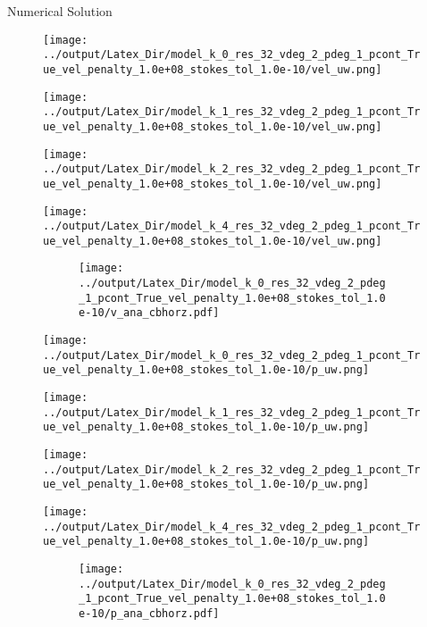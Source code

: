 \documentclass[10pt,aspectratio=169]{beamer}
\begin{document}
\begin{frame}{Numerical Solution}
	\vspace{-0.32in}
	\begin{figure}[!htb]
		\begin{multicols}{4}
			\texttt{[image: ../output/Latex\_Dir/model\_k\_0\_res\_32\_vdeg\_2\_pdeg\_1\_pcont\_True\_vel\_penalty\_1.0e+08\_stokes\_tol\_1.0e-10/vel\_uw.png]}\par
			\hspace{0.75in}
			\texttt{[image: ../output/Latex\_Dir/model\_k\_1\_res\_32\_vdeg\_2\_pdeg\_1\_pcont\_True\_vel\_penalty\_1.0e+08\_stokes\_tol\_1.0e-10/vel\_uw.png]}\par
			\hspace{1.5in}
			\texttt{[image: ../output/Latex\_Dir/model\_k\_2\_res\_32\_vdeg\_2\_pdeg\_1\_pcont\_True\_vel\_penalty\_1.0e+08\_stokes\_tol\_1.0e-10/vel\_uw.png]}\par
			\hspace{2.25in}
			\texttt{[image: ../output/Latex\_Dir/model\_k\_4\_res\_32\_vdeg\_2\_pdeg\_1\_pcont\_True\_vel\_penalty\_1.0e+08\_stokes\_tol\_1.0e-10/vel\_uw.png]}
		\end{multicols}
		\vspace{-0.29in}
		\begin{figure}
			\hspace{0.1in} 
			\texttt{[image: ../output/Latex\_Dir/model\_k\_0\_res\_32\_vdeg\_2\_pdeg\_1\_pcont\_True\_vel\_penalty\_1.0e+08\_stokes\_tol\_1.0e-10/v\_ana\_cbhorz.pdf]}
		\end{figure}
	\end{figure}
	
	\begin{figure}[!htb]
		\vspace{-0.5in}
		\begin{multicols}{4}
			\texttt{[image: ../output/Latex\_Dir/model\_k\_0\_res\_32\_vdeg\_2\_pdeg\_1\_pcont\_True\_vel\_penalty\_1.0e+08\_stokes\_tol\_1.0e-10/p\_uw.png]}\par
			\hspace{0.75in}
			\texttt{[image: ../output/Latex\_Dir/model\_k\_1\_res\_32\_vdeg\_2\_pdeg\_1\_pcont\_True\_vel\_penalty\_1.0e+08\_stokes\_tol\_1.0e-10/p\_uw.png]}\par
			\hspace{1.5in}
			\texttt{[image: ../output/Latex\_Dir/model\_k\_2\_res\_32\_vdeg\_2\_pdeg\_1\_pcont\_True\_vel\_penalty\_1.0e+08\_stokes\_tol\_1.0e-10/p\_uw.png]}\par
			\hspace{2.25in}
			\texttt{[image: ../output/Latex\_Dir/model\_k\_4\_res\_32\_vdeg\_2\_pdeg\_1\_pcont\_True\_vel\_penalty\_1.0e+08\_stokes\_tol\_1.0e-10/p\_uw.png]}
		\end{multicols}
		\vspace{-0.27in}
		\begin{figure}
			\hspace{0.1in} 
			\texttt{[image: ../output/Latex\_Dir/model\_k\_0\_res\_32\_vdeg\_2\_pdeg\_1\_pcont\_True\_vel\_penalty\_1.0e+08\_stokes\_tol\_1.0e-10/p\_ana\_cbhorz.pdf]}
		\end{figure}
	\end{figure}
\end{frame}
\end{document}
